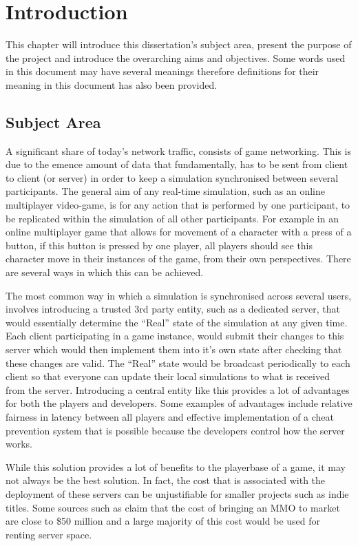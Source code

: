 \chapter{Introduction}
This chapter will introduce this dissertation's subject area, present the purpose of the project and introduce the overarching aims and objectives. Some words used in this document may have several meanings therefore definitions for their meaning in this document has also been provided.


\section{Subject Area}
A significant share of today's network traffic, consists of game networking. This is due to the emence amount of data that fundamentally, has to be sent from client to client (or server) in order to keep a simulation synchronised between several participants. The general aim of any real-time simulation, such as an online multiplayer video-game, is for any action that is performed by one participant, to be replicated within the simulation of all other participants. For example in an online multiplayer game that allows for movement of a character with a press of a button, if this button is pressed by one player, all players should see this character move in their instances of the game, from their own perspectives. There are several ways in which this can be achieved.

The most common way in which a simulation is synchronised across several users, involves introducing a trusted 3rd party entity, such as a dedicated server, that would essentially determine the ``Real'' state of the simulation at any given time. Each client participating in a game instance, would submit their changes to this server which would then implement them into it's own state after checking that these changes are valid. The ``Real'' state would be broadcast periodically to each client so that everyone can update their local simulations to what is received from the server. Introducing a central entity like this provides a lot of advantages for both the players and developers. Some examples of advantages include relative fairness in latency between all players and effective implementation of a cheat prevention system that is possible because the developers control how the server works.

While this solution provides a lot of benefits to the playerbase of a game, it may not always be the best solution. In fact, the cost that is associated with the deployment of these servers can be unjustifiable for smaller projects such as indie titles. Some sources such as  claim that the cost of bringing an MMO to market are close to \$50 million and a large majority of this cost would be used for renting server space.

